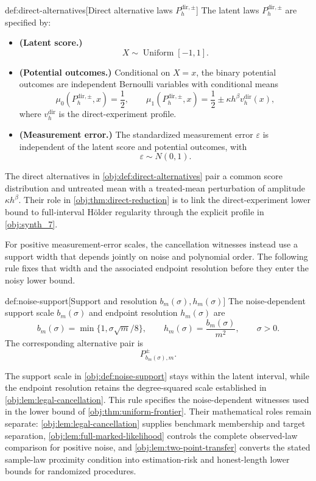 \documentclass[11pt]{article}
\begin{document}
\begin{definitionv}{def:direct-alternatives}[Direct alternative laws \(P_h^{\mathrm{dir},\pm}\)]
The latent laws \(P_h^{\mathrm{dir},\pm}\) are specified by:
\begin{itemize}
\item \textbf{(Latent score.)}
\[
X\sim\operatorname{Uniform}[-1,1].
\]
\item \textbf{(Potential outcomes.)} Conditional on \(X=x\), the binary potential outcomes are independent Bernoulli variables with conditional means
\[
\mu_0(P_h^{\mathrm{dir},\pm},x)=\frac12,
\qquad
\mu_1(P_h^{\mathrm{dir},\pm},x)
=\frac12\pm\kappa h^\beta v_h^{\mathrm{dir}}(x),
\]
where \(v_h^{\mathrm{dir}}\) is the direct-experiment profile.
\item \textbf{(Measurement error.)} The standardized measurement error \(\varepsilon\) is independent of the latent score and potential outcomes, with
\[
\varepsilon\sim N(0,1).
\]
\end{itemize}
\end{definitionv}

The direct alternatives  in \cref{obj:def:direct-alternatives} pair a common score distribution and untreated mean with a treated-mean perturbation of amplitude \(\kappa h^\beta\). Their role in \cref{obj:thm:direct-reduction} is to link the direct-experiment lower bound to full-interval Hölder regularity through the explicit profile in \cref{obj:synth_7}.

For positive measurement-error scales, the cancellation witnesses instead use a support width that depends jointly on noise and polynomial order. The following rule fixes that width and the associated endpoint resolution before they enter the noisy lower bound.

\begin{definitionv}{def:noise-support}[Support and resolution \(b_m(\sigma),h_m(\sigma)\)]
The noise-dependent support scale \(b_m(\sigma)\) and endpoint resolution \(h_m(\sigma)\) are
\[
b_m(\sigma)=\min\{1,\sigma\sqrt m/8\},
\qquad
h_m(\sigma)=\frac{b_m(\sigma)}{m^2},
\qquad \sigma>0.
\]
The corresponding alternative pair is
\[
P^\pm_{b_m(\sigma),m}.
\]
\end{definitionv}

The support scale  in \cref{obj:def:noise-support} stays within the latent interval, while the endpoint resolution  retains the degree-squared scale established in \cref{obj:lem:legal-cancellation}. This rule specifies the noise-dependent witnesses used in the lower bound of \cref{obj:thm:uniform-frontier}. Their mathematical roles remain separate: \cref{obj:lem:legal-cancellation} supplies benchmark membership and target separation, \cref{obj:lem:full-marked-likelihood} controls the complete observed-law comparison for positive noise, and \cref{obj:lem:two-point-transfer} converts the stated sample-law proximity condition into estimation-risk and honest-length lower bounds for randomized procedures.
\end{document}
